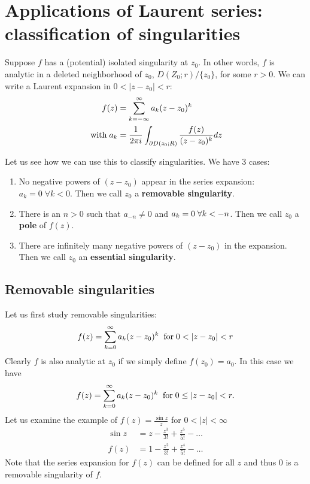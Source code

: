 \section{Applications of Laurent series: classification of singularities}

Suppose $f$ has a (potential) isolated singularity at $z_0$. In other words, $f$ is analytic in a deleted neighborhood of $z_0$, $D(Z_0;r)/\{z_0\}$, for some $r > 0$.
We can write a Laurent expansion in $0<|z-z_0|<r$:
\begin{align*}
    f(z)&=\sum_{k=-\infty}^\infty a_k (z-z_0)^k\\
    \;\textnormal{with}\; a_k&=\frac{1}{2\pi i}\int_{\partial D(z_0;R)} \frac{f(z)}{(z-z_0)^k} dz
\end{align*}

Let us see how we can use this to classify singularities. We have 3 cases:
\begin{enumerate}
    \item No negative powers of $(z-z_0)$ appear in the series expansion: $a_k=0\; \forall k<0$. Then we call $z_0$ a \textbf{removable singularity}.
    \item There is an $n>0$ such that $a_{-n}\neq0$ and $a_k=0 \;\forall k<-n$. Then we call $z_0$ a \textbf{pole} of $f(z)$.
    \item There are infinitely many negative powers of $(z-z_0)$ in the expansion. Then we call $z_0$ an \textbf{essential singularity}.
\end{enumerate}

\subsection{Removable singularities}
Let us first study removable singularities:
\begin{align*}
    f(z)=\sum_{k=0}^\infty a_k(z-z_0)^k\; \nm{for} 0<|z-z_0|<r
\end{align*}
Clearly $f$ is also analytic at $z_0$ if we simply define $f(z_0)=a_0$. In this case we have
\begin{align*}
    f(z)=\sum_{k=0}^\infty a_k(z-z_0)^k\; \;\textnormal{for}\; 0\leq|z-z_0|<r.
\end{align*}
Let us examine the example of $f(z)=\frac{\sin z}{z}$ for $0<|z|<\infty$
\begin{align*}
    \sin z &= z - \frac{z^3}{3!}+\frac{z^5}{5!}-\dots\\
    f(z)&=1-\frac{z^2}{3!}+\frac{z^4}{5!}-\dots
\end{align*}
Note that the series expansion for $f(z)$ can be defined for all $z$ and thus 0 is a removable singularity of $f$.

